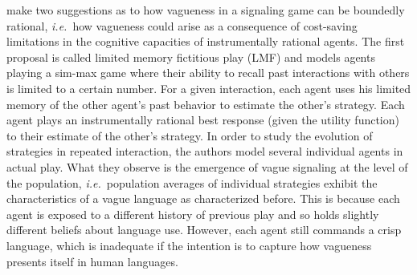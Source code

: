 \documentclass[a4paper]{article}
\begin{document}
\textcite{franke_vagueness_2011} make two suggestions as to how vagueness in a signaling game can be boundedly rational, \emph{i.e.}~how vagueness could arise as a consequence of cost-saving limitations in the cognitive capacities of instrumentally rational agents.
The first proposal is called limited memory fictitious play (LMF) and models agents playing a sim-max game where their ability to recall past interactions with others is limited to a certain number.
For a given interaction, each agent uses his limited memory of the other agent's past behavior to estimate the other's strategy.
Each agent plays an instrumentally rational best response (given the utility function) to their estimate of the other's strategy.
In order to study the evolution of strategies in repeated interaction, the authors model several individual agents in actual play.
What they observe is the emergence of vague signaling at the level of the population, \emph{i.e.}~population averages of individual strategies exhibit the characteristics of a vague language as characterized before.
This is because each agent is exposed to a different history of previous play and so holds slightly different beliefs about language use.
However, each agent still commands a crisp language, which is inadequate if the intention is to capture how vagueness presents itself in human languages.
\end{document}
